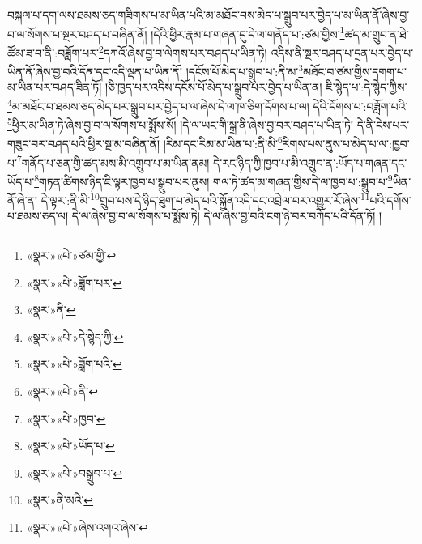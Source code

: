 བསྐལ་པ་དག་ལས་ཐམས་ཅད་གཟིགས་པ་མ་ཡིན་པའི་མ་མཐོང་བས་མེད་པ་སྒྲུབ་པར་བྱེད་པ་མ་ཡིན་ནོ་ཞེས་བྱ་བ་ལ་སོགས་པ་སྔར་བཤད་པ་བཞིན་ནོ། །དེའི་ཕྱིར་རྣམ་པ་གཞན་དུ་དེ་ལ་གནོད་པ་:ཙམ་གྱིས་\footnote{«སྣར་»«པེ་»ཙམ་གྱི་}ཚད་མ་གྲུབ་ན་ཐེ་ཚོམ་ཟ་བ་ནི་:བཟློག་པར་\footnote{«སྣར་»«པེ་»ཟློག་པར་}དཀའོ་ཞེས་བྱ་བ་ལེགས་པར་བཤད་པ་ཡིན་ཏེ། འདིས་ནི་སྔར་བཤད་པ་དྲན་པར་བྱེད་པ་ཡིན་ནོ་ཞེས་བྱ་བའི་དོན་དང་འདི་ལྡན་པ་ཡིན་ནོ། །དངོས་པོ་མེད་པ་སྒྲུབ་པ་:ནི་མ་\footnote{«སྣར་»ནི་}མཐོང་བ་ཙམ་གྱིས་དགག་པ་མ་ཡིན་པར་བཤད་ཟིན་ཏོ། །ཅི་ཁྱད་པར་འདིས་དངོས་པོ་མེད་པ་སྒྲུབ་པར་བྱེད་པ་ཡིན་ན། ཇི་སྙེད་པ་:དེ་སྙེད་ཀྱིས་\footnote{«སྣར་»«པེ་»དེ་སྙེད་ཀྱི་}མ་མཐོང་བ་ཐམས་ཅད་མེད་པར་སྒྲུབ་པར་བྱེད་པ་ལ་ཞེས་དེ་ལ་ཁ་ཅིག་དོགས་པ་ལ། དེའི་དོགས་པ་:བཟློག་པའི་\footnote{«སྣར་»«པེ་»ཟློག་པའི་}ཕྱིར་མ་ཡིན་ཏེ་ཞེས་བྱ་བ་ལ་སོགས་པ་སྨོས་སོ། །དེ་ལ་ཡང་གི་སྒྲ་ནི་ཞེས་བྱ་བར་བཤད་པ་ཡིན་ཏེ། དེ་ནི་ངེས་པར་གཟུང་བར་བཤད་པའི་ཕྱིར་སྔ་མ་བཞིན་ནོ། །རིམ་དང་རིམ་མ་ཡིན་པ་:ནི་མི་\footnote{«སྣར་»«པེ་»ནི་}རིགས་པས་ནུས་པ་མེད་པ་ལ་:ཁྱབ་པ་\footnote{«སྣར་»«པེ་»ཁྱབ་}གནོད་པ་ཅན་གྱི་ཚད་མས་མི་འགྲུབ་པ་མ་ཡིན་ནམ། དེ་རང་ཉིད་ཀྱི་ཁྱབ་པ་མི་འགྲུབ་ན་:ཡོད་པ་གཞན་དང་ཡོད་པ་\footnote{«སྣར་»«པེ་»ཡོད་པ་}གཏན་ཚིགས་ཉིད་ཇི་ལྟར་ཁྱབ་པ་སྒྲུབ་པར་ནུས། གལ་ཏེ་ཚད་མ་གཞན་གྱིས་དེ་ལ་ཁྱབ་པ་:སྒྲུབ་པ་\footnote{«སྣར་»«པེ་»བསྒྲུབ་པ་}ཡིན་ནོ་ཞེ་ན། དེ་ལྟར་:ནི་མི་\footnote{«སྣར་»ནི་མའི་}གྲུབ་པས་དེ་ཉིད་ཐུག་པ་མེད་པའི་སྐྱོན་འདི་དང་འབྲེལ་བར་འགྱུར་རོ་ཞེས་\footnote{«སྣར་»«པེ་»ཞེས་འགའ་ཞེས་}པའི་དགོས་པ་ཐམས་ཅད་ལ། དེ་ལ་ཞེས་བྱ་བ་ལ་སོགས་པ་སྨོས་ཏེ། དེ་ལ་ཞེས་བྱ་བའི་ངག་ཉེ་བར་བཀོད་པའི་དོན་ཏོ། །
